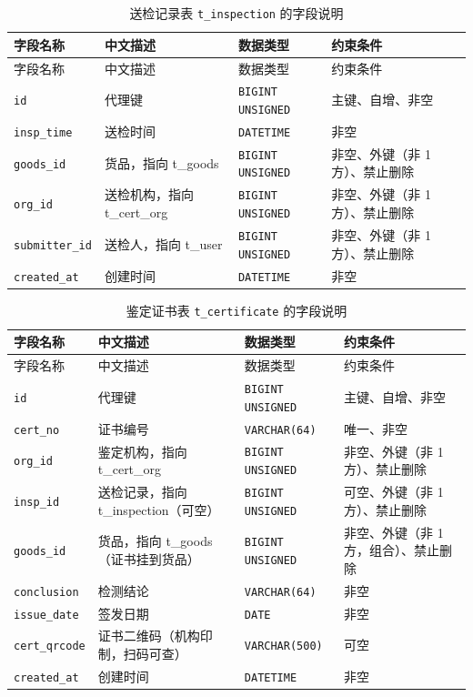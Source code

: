 \documentclass[12pt, a4paper]{ctexart}
\newcommand{\code}[1]{\texttt{\small #1}}
\begin{document}
\begin{longtable}{@{}p{3.1cm} p{4.5cm} p{2.4cm} p{4.5cm}@{}}
\caption{送检记录表 \code{t\_inspection} 的字段说明}\label{tab:f-t-inspection}\\
\toprule
字段名称 & 中文描述 & 数据类型 & 约束条件 \\
\midrule
\endfirsthead
\toprule
字段名称 & 中文描述 & 数据类型 & 约束条件 \\
\midrule
\endhead
\bottomrule
\endlastfoot
\code{id} & 代理键 & \code{BIGINT UNSIGNED} & 主键、自增、非空 \\
\code{insp\_time} & 送检时间 & \code{DATETIME} & 非空 \\
\code{goods\_id} & 货品，指向 t\_goods & \code{BIGINT UNSIGNED} & 非空、外键（非 1 方）、禁止删除 \\
\code{org\_id} & 送检机构，指向 t\_cert\_org & \code{BIGINT UNSIGNED} & 非空、外键（非 1 方）、禁止删除 \\
\code{submitter\_id} & 送检人，指向 t\_user & \code{BIGINT UNSIGNED} & 非空、外键（非 1 方）、禁止删除 \\
\code{created\_at} & 创建时间 & \code{DATETIME} & 非空 \\
\end{longtable}

\begin{longtable}{@{}p{3.1cm} p{4.5cm} p{2.4cm} p{4.5cm}@{}}
\caption{鉴定证书表 \code{t\_certificate} 的字段说明}\label{tab:f-t-certificate}\\
\toprule
字段名称 & 中文描述 & 数据类型 & 约束条件 \\
\midrule
\endfirsthead
\toprule
字段名称 & 中文描述 & 数据类型 & 约束条件 \\
\midrule
\endhead
\bottomrule
\endlastfoot
\code{id} & 代理键 & \code{BIGINT UNSIGNED} & 主键、自增、非空 \\
\code{cert\_no} & 证书编号 & \code{VARCHAR(64)} & 唯一、非空 \\
\code{org\_id} & 鉴定机构，指向 t\_cert\_org & \code{BIGINT UNSIGNED} & 非空、外键（非 1 方）、禁止删除 \\
\code{insp\_id} & 送检记录，指向 t\_inspection（可空） & \code{BIGINT UNSIGNED} & 可空、外键（非 1 方）、禁止删除 \\
\code{goods\_id} & 货品，指向 t\_goods（证书挂到货品） & \code{BIGINT UNSIGNED} & 非空、外键（非 1 方，组合）、禁止删除 \\
\code{conclusion} & 检测结论 & \code{VARCHAR(64)} & 非空 \\
\code{issue\_date} & 签发日期 & \code{DATE} & 非空 \\
\code{cert\_qrcode} & 证书二维码（机构印制，扫码可查） & \code{VARCHAR(500)} & 可空 \\
\code{created\_at} & 创建时间 & \code{DATETIME} & 非空 \\
\end{longtable}
\end{document}
